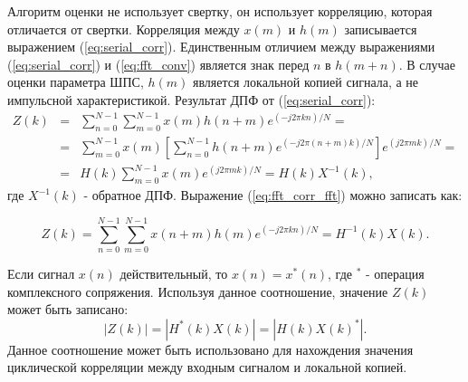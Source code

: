 Алгоритм оценки не использует свертку, он использует корреляцию, которая отличается от свертки. Корреляция
между $x(m)$ и $h(m)$ записывается выражением (\ref{eq:serial_corr}).
Единственным отличием между выражениями (\ref{eq:serial_corr}) и (\ref{eq:fft_conv}) является знак перед $n$ в ${h(m+n)}$.
В случае оценки параметра ШПС, $h(m)$ является локальной копией сигнала, а не импульсной характеристикой. Результат ДПФ от (\ref{eq:serial_corr}):
\begin{eqnarray}
	\label{eq:fft_corr_fft}
	Z(k) & = & \sum\limits_{n=0}^{N-1}\sum\limits_{m=0}^{N-1}{x(m)h(n+m)e^{(-j2\pi{kn})/N}}=\nonumber \\
	& = & \sum\limits_{m=0}^{N-1}{x(m)}[\sum\limits_{n=0}^{N-1}h(n+m)e^{(-j2\pi{(n+m)}k)/N}]e^{(j2\pi{m}k)/N}=\\
	& = & H(k)\sum\limits_{m=0}^{N-1}x(m)e^{(j2\pi{m}k)/N} = H(k)X^{-1}(k)\nonumber,
\end{eqnarray}
где ${X^{-1}(k)}$ - обратное ДПФ. Выражение (\ref{eq:fft_corr_fft}) можно записать как:

\begin{equation}
	\label{eq:fft_corr_fft_rev}
	Z(k) = \sum\limits_{n=0}^{N-1}\sum\limits_{m=0}^{N-1}{x(n+m)h(m)e^{(-j2\pi{kn})/N}}=H^{-1}(k)X(k).
\end{equation}

Если сигнал $x(n)$ действительный, то $x(n) = x^*(n)$, где ${^*}$ - операция комплексного сопряжения. Используя данное соотношение,
значение $Z(k)$ может быть записано:
\begin{equation}
	\label{eq:fft_magnitude}
	|Z(k)|=|H^*(k)X(k)|=|H(k)X(k)^*|.
\end{equation}
Данное соотношение может быть использовано для нахождения значения циклической корреляции между входным сигналом и 
локальной копией.

